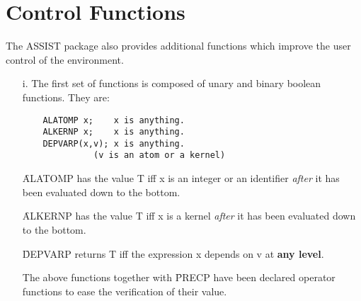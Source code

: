 \section{Control Functions}

The ASSIST package also provides additional functions which
improve the user control of the environment.
\begin{itemize}
\item[i.]
The first set of functions is composed of unary and binary boolean functions.
They are:
\begin{verbatim}
	ALATOMP x;    x is anything.
	ALKERNP x;    x is anything.
	DEPVARP(x,v); x is anything.
		      (v is an atom or a kernel)
\end{verbatim}
\f{ALATOMP} has the value T iff x is an integer or
an identifier {\em after} it has been evaluated down to the bottom.

\f{ALKERNP} has the value T iff x is a kernel {\em
after} it has been evaluated down to the bottom.

\f{DEPVARP} returns T iff the expression x depends on
v at {\bf any level}.

The above functions together with \f{PRECP} have been
declared operator functions to ease the verification of their value.


\end{itemize}

